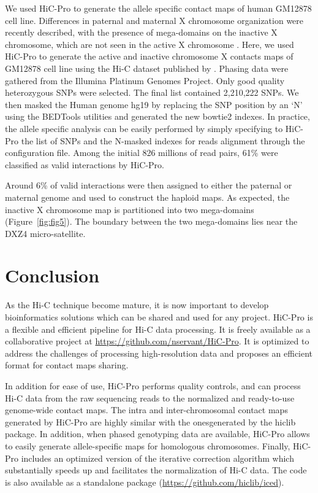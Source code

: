 We used HiC-Pro to generate the allele specific contact maps of human GM12878
cell line. Differences in paternal and maternal X chromosome organization were
recently described, with the presence of mega-domains on the inactive X
chromosome, which are not seen in the active X chromosome \citep{rao:3d,
minajigi:comprehensive}. Here, we used HiC-Pro to generate the active and
inactive chromosome X contacts maps of GM12878 cell line using the Hi-C
dataset published by \citep{selvaraj:whole-genome}. Phasing data were gathered
from the Illumina Platinum Genomes Project. Only good quality heterozygous
SNPs were selected. The final list contained 2,210,222 SNPs. We then masked
the Human genome hg19 by replacing the SNP position by an ‘N’ using the
BEDTools utilities \citep{quinlan:bedtools} and generated the new bowtie2
indexes. In practice, the allele specific analysis can be easily performed by
simply specifying to HiC-Pro the list of SNPs and the N-masked indexes for
reads alignment through the configuration file. Among the initial 826 millions
of read pairs, 61\% were classified as valid interactions by HiC-Pro.

Around 6\% of valid interactions were then assigned to either the paternal or
maternal genome and used to construct the haploid maps. As expected, the
inactive X chromosome map is partitioned into two mega-domains
(Figure~\ref{fig:fig5}). The
boundary between the two mega-domains lies near the DXZ4 micro-satellite.

\section{Conclusion}

As the Hi-C technique become mature, it is now important to develop
bioinformatics solutions which can be shared and used for any project. HiC-Pro
is a flexible and efficient pipeline for Hi-C data processing. It is freely
available as a collaborative project at
\href{https://github.com/nservant/HiC-Pro}{https://github.com/nservant/HiC-Pro}.
It is optimized to address the challenges of processing high-resolution data
and proposes an efficient format for contact maps sharing.

In addition for ease of use, HiC-Pro performs quality controls, and can
process Hi-C data from the raw sequencing reads to the normalized and
ready-to-use genome-wide contact maps. The intra and inter-chromosomal contact
maps generated by HiC-Pro are highly similar with the onesgenerated by the
hiclib package. In addition, when phased genotyping data are available,
HiC-Pro allows to easily generate allele-specific maps for homologous
chromosomes. Finally, HiC-Pro includes an optimized version of the iterative
correction algorithm which substantially speeds up and facilitates the
normalization of Hi-C data. The code is also available as a standalone package
(\href{https://github.com/hiclib/iced}{https://github.com/hiclib/iced}).

